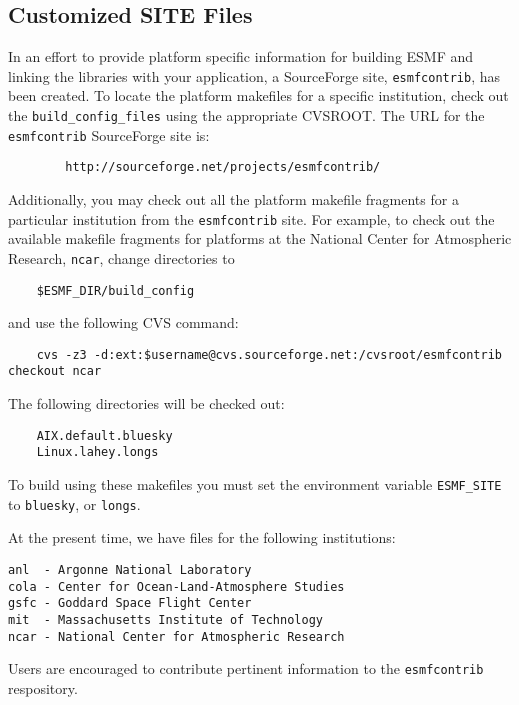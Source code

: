 \subsection{Customized SITE Files}

In an effort to provide platform specific information for building ESMF 
and linking the libraries with your application, a SourceForge 
site, {\tt esmfcontrib}, has been created.
To locate the platform makefiles for a specific institution, check out 
the {\tt build\_config\_files} using the appropriate CVSROOT.
The URL for the {\tt esmfcontrib} SourceForge site is:

\begin{verbatim}
        http://sourceforge.net/projects/esmfcontrib/
\end{verbatim}

Additionally, you may check out all the platform makefile fragments 
for a particular institution from the {\tt esmfcontrib} site. For example, 
to check out the available makefile fragments for platforms at the
National Center for Atmospheric Research, {\tt ncar}, change directories to

\begin{verbatim}
 	$ESMF_DIR/build_config
\end{verbatim}

and use the following CVS command:

\begin{verbatim}
	cvs -z3 -d:ext:$username@cvs.sourceforge.net:/cvsroot/esmfcontrib checkout ncar
\end{verbatim}

The following directories will be checked out:

\begin{verbatim}
	AIX.default.bluesky
	Linux.lahey.longs
\end{verbatim}

To build using these makefiles you must set the environment 
variable {\tt ESMF\_SITE} to {\tt bluesky}, or {\tt longs}.

At the present time, we have files for the following institutions:

\begin{verbatim}
anl  - Argonne National Laboratory
cola - Center for Ocean-Land-Atmosphere Studies
gsfc - Goddard Space Flight Center
mit  - Massachusetts Institute of Technology
ncar - National Center for Atmospheric Research
\end{verbatim}


Users are encouraged to contribute pertinent information to the 
{\tt esmfcontrib} respository.





